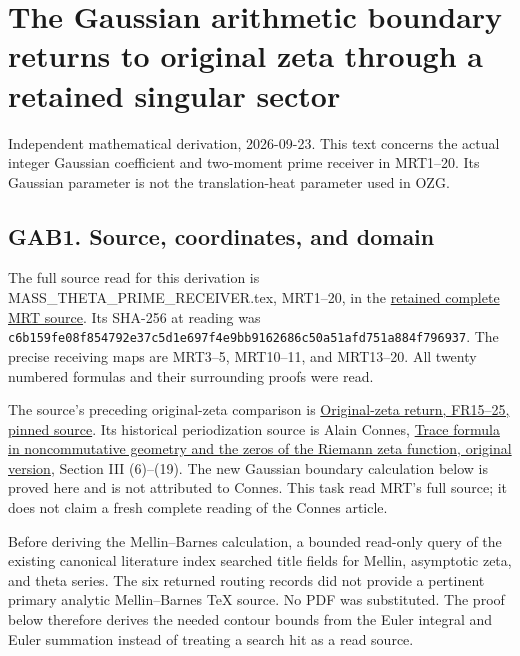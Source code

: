 \documentclass[
  10pt,
  a4paper,
]{article}
\author{}
\date{}
\begin{document}
{
\setcounter{tocdepth}{3}
\tableofcontents
}
\section{The Gaussian arithmetic boundary returns to original zeta
through a retained singular
sector}\label{the-gaussian-arithmetic-boundary-returns-to-original-zeta-through-a-retained-singular-sector}

Independent mathematical derivation, 2026-09-23. This text concerns the
actual integer Gaussian coefficient and two-moment prime receiver in
MRT1--20. Its Gaussian parameter is not the translation-heat parameter
used in OZG.

\subsection{GAB1. Source, coordinates, and
domain}\label{gab1.-source-coordinates-and-domain}

The full source read for this derivation is
MASS\_THETA\_PRIME\_RECEIVER.tex, MRT1--20, in the
\href{supporting_proofs/MASS_THETA_PRIME_RECEIVER.tex}{retained complete
MRT source}. Its SHA-256 at reading was
\texttt{c6b159fe\allowbreak{}08f85479\allowbreak{}2e37c5d1\allowbreak{}e697f4e9\allowbreak{}bb916268\allowbreak{}6c50a51a\allowbreak{}fd751a88\allowbreak{}4f796937}.
The precise receiving maps are MRT3--5, MRT10--11, and MRT13--20. All
twenty numbered formulas and their surrounding proofs were read.

The source's preceding original-zeta comparison is
\href{https://github.com/KokunoYumeto/zeta-function-research-reader/blob/ec73ac350d0cda3d95c0bd1361bede33166b4d34/workbenches/splitzero-tandem/continuations/20260923-original-zeta-return/NOTE.tex}{Original-zeta
return, FR15--25, pinned source}. Its historical periodization source is
Alain Connes, \href{https://arxiv.org/abs/math/9811068v1}{Trace formula
in noncommutative geometry and the zeros of the Riemann zeta function,
original version}, Section III (6)--(19). The new Gaussian boundary
calculation below is proved here and is not attributed to Connes. This
task read MRT's full source; it does not claim a fresh complete reading
of the Connes article.

Before deriving the Mellin--Barnes calculation, a bounded read-only
query of the existing canonical literature index searched title fields
for Mellin, asymptotic zeta, and theta series. The six returned routing
records did not provide a pertinent primary analytic Mellin--Barnes TeX
source. No PDF was substituted. The proof below therefore derives the
needed contour bounds from the Euler integral and Euler summation
instead of treating a search hit as a read source.
\end{document}

